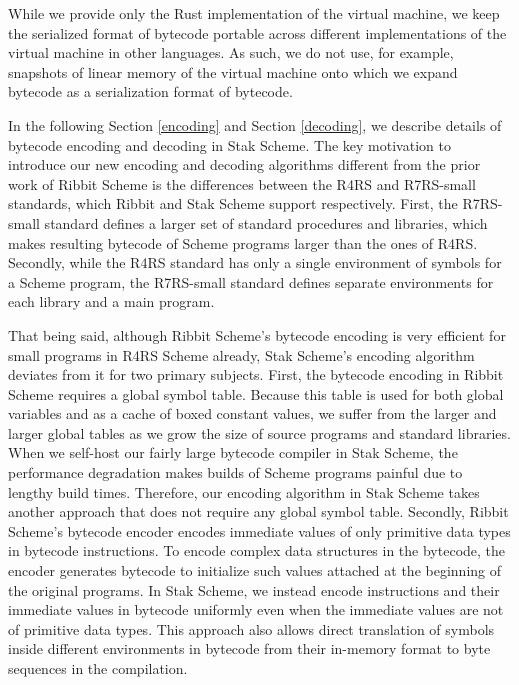\documentclass[sigplan, anonymous, review]{acmart}
\begin{document}
While we provide only the Rust implementation of the virtual machine,
we keep the serialized format of bytecode portable across
different implementations of the virtual machine in other languages.
As such, we do not use, for example, snapshots of linear
memory of the virtual machine onto which we expand bytecode as a
serialization format of bytecode.

In the following Section \ref{encoding} and Section \ref{decoding},
we describe details of bytecode encoding and decoding in Stak Scheme.
The key motivation to introduce our new encoding and decoding
algorithms different from the prior work of Ribbit Scheme is the differences
between the R4RS and R7RS-small standards, which Ribbit and Stak Scheme
support respectively.
First, the R7RS-small standard defines a larger set of standard
procedures and libraries, which makes resulting bytecode of Scheme
programs larger than the ones of R4RS.
Secondly, while the R4RS standard has only a single environment of
symbols for a Scheme program, the R7RS-small standard defines
separate environments for each library and a main program.

That being said, although Ribbit Scheme's bytecode encoding is very efficient
for small programs in R4RS Scheme already, Stak Scheme's encoding algorithm
deviates from it for two primary subjects.
First, the bytecode encoding in Ribbit Scheme requires a global symbol table.
Because this table is used for both global variables and as a cache of
boxed constant values, we suffer from the larger and larger global tables
as we grow the size of source programs and standard libraries.
When we self-host our fairly large bytecode compiler in Stak Scheme,
the performance degradation makes builds of Scheme programs painful due
to lengthy build times.
Therefore, our encoding algorithm in Stak Scheme takes another approach that
does not require any global symbol table.
Secondly, Ribbit Scheme's bytecode encoder encodes
immediate values of only primitive data types in bytecode instructions.
To encode complex data structures in the bytecode, the encoder
generates bytecode to initialize such values attached at the
beginning of the original programs.
In Stak Scheme, we instead encode instructions and their immediate
values in bytecode uniformly even when the immediate values are not
of primitive data types.
This approach also allows direct translation of symbols inside
different environments in bytecode from their in-memory format to
byte sequences in the compilation.
\end{document}
